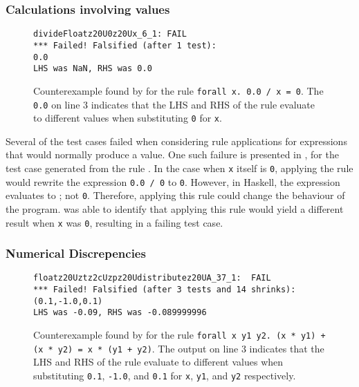 {\subsubsection{Calculations involving \NaN values}

\begin{figure}
  \begin{verbatim}
divideFloatz20U0z20Ux_6_1: FAIL
*** Failed! Falsified (after 1 test):
0.0
LHS was NaN, RHS was 0.0
  \end{verbatim}
  \caption{Counterexample found by \Rulecheck for the rule \texttt{forall x. 0.0
/ x = 0}. The \texttt{0.0} on line 3 indicates that the LHS and RHS
of the rule evaluate to different values when substituting \texttt{0} for \texttt{x}.}
  \label{fig:div0}
\end{figure}

Several of the test cases failed when considering rule applications for
expressions that would normally produce a \NaN value. One such failure is
presented in , for the test case generated from the rule
. In the case when \texttt{x} itself is
\texttt{0}, applying the rule would rewrite the expression \texttt{0.0 / 0} to
\texttt{0}. However, in Haskell, the expression  evaluates to
\NaN; not \texttt{0}. Therefore, applying this rule could change the
behaviour of the program. \Rulecheck was able to identify that applying this
rule would yield a different result when \texttt{x} was \texttt{0}, resulting in
a failing test case.

\subsubsection{Numerical Discrepencies}

\begin{figure}
  \begin{verbatim}
floatz20Uztz2cUzpz20Udistributez20UA_37_1:  FAIL
*** Failed! Falsified (after 3 tests and 14 shrinks):
(0.1,-1.0,0.1)
LHS was -0.09, RHS was -0.089999996
  \end{verbatim}
  \caption{Counterexample found by \Rulecheck for the rule \texttt{forall x y1
y2. (x * y1) + (x * y2) = x * (y1 + y2)}. The output on line 3 indicates
that the LHS and RHS of the rule evaluate to different values when substituting
\texttt{0.1}, \texttt{-1.0}, and \texttt{0.1} for \texttt{x}, \texttt{y1}, and \texttt{y2} respectively.}
  \label{fig:dist}
\end{figure}

}
